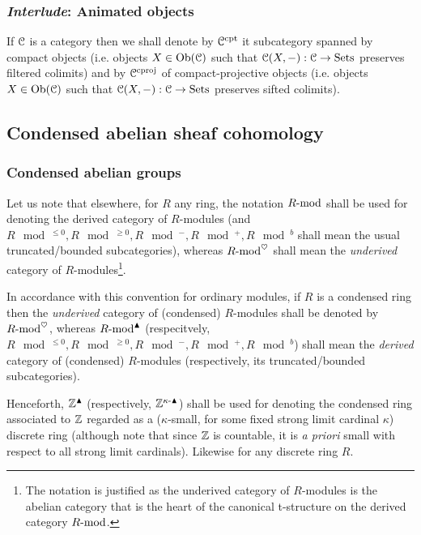         \subsubsection{\textit{Interlude}: Animated objects}
            \begin{convention}
                If $\C$ is a category then we shall denote by $\C^{\cpt}$ it subcategory spanned by compact objects (i.e. objects $X \in \Ob(\C)$ such that $\C(X, -): \C \to \Sets$ preserves filtered colimits) and by $\C^{\cproj}$ of compact-projective objects (i.e. objects $X \in \Ob(\C)$ such that $\C(X, -): \C \to \Sets$ preserves sifted colimits).
            \end{convention}
            \begin{definition} \label{def: animated_obejcts}
                
            \end{definition}
            
    \subsection{Condensed abelian sheaf cohomology}
        \subsubsection{Condensed abelian groups}
            \begin{convention} \label{conv: derived_categories_of_condensed_modules}
                Let us note that elsewhere, for $R$ any ring, the notation $R\mod$ shall be used for denoting the derived category of $R$-modules (and $R\mod^{\leq 0}, R\mod^{\geq 0}, R\mod^-, R\mod^+, R\mod^b$ shall mean the usual truncated/bounded subcategories), whereas $R\mod^{\heart}$ shall mean the \textit{underived} category of $R$-modules\footnote{The notation is justified as the underived category of $R$-modules is the abelian category that is the heart of the canonical t-structure on the derived category $R\mod$.}. 
                
                In accordance with this convention for ordinary modules, if $R$ is a condensed ring then the \textit{underived} category of (condensed) $R$-modules shall be denoted by $R\mod^{\heart}$, whereas $R\mod^{\cond}$ (respecitvely, $R\mod^{\leq 0}, R\mod^{\geq 0}, R\mod^-, R\mod^+, R\mod^b$) shall mean the \textit{derived} category of (condensed) $R$-modules (respectively, its truncated/bounded subcategories).
            \end{convention}
            \begin{convention}
                Henceforth, $\Z^{\cond}$ (respectively, $\Z^{\kappa\-\cond}$) shall be used for denoting the condensed ring associated to $\Z$ regarded as a ($\kappa$-small, for some fixed strong limit cardinal $\kappa$) discrete ring (although note that since $\Z$ is countable, it is \textit{a priori} small with respect to all strong limit cardinals). Likewise for any discrete ring $R$.
            \end{convention}
            

